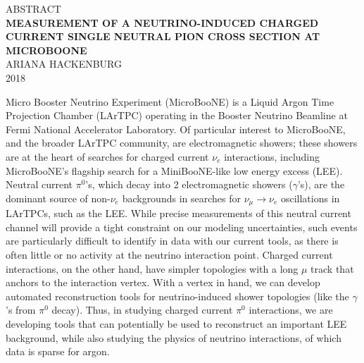 %

\thispagestyle{empty}
\begin{center}
{\footnotesize ABSTRACT}\\
\vspace{4 mm}
{\large \textbf{MEASUREMENT OF A NEUTRINO-INDUCED CHARGED CURRENT SINGLE NEUTRAL PION CROSS SECTION AT MICROBOONE}}\\
\vspace{6 mm}
{\footnotesize ARIANA HACKENBURG\\
2018\\}
\end{center}

\par
Micro Booster Neutrino Experiment (MicroBooNE) is a Liquid Argon Time Projection Chamber (LArTPC) operating in the Booster Neutrino Beamline at Fermi National Accelerator Laboratory.  Of particular interest to MicroBooNE, and the broader LArTPC community, are electromagnetic showers; these showers are at the heart of searches for charged current $\nu_e$ interactions, including MicroBooNE's flagship search for a MiniBooNE-like low energy excess (LEE).  Neutral current $\pi^0$'s, which decay into 2 electromagnetic showers ($\gamma$'s), are the dominant source of non-$\nu_e$ backgrounds in searches for $\nu_{\mu}\rightarrow\nu_e$ oscillations in LArTPCs, such as the LEE. While precise measurements of this neutral current channel will provide a tight constraint on our modeling uncertainties, such events are particularly difficult to identify in data with our current tools, as there is often little or no activity at the neutrino interaction point. Charged current interactions, on the other hand, have simpler topologies with a long $\mu$ track that anchors to the interaction vertex.  With a vertex in hand, we can develop automated reconstruction tools for neutrino-induced shower topologies (like the $\gamma$'s from $\pi^0$ decay). Thus, in studying charged current $\pi^0$ interactions, we are developing tools that can potentially be used to reconstruct an important LEE background, while also studying the physics of neutrino interactions, of which data is sparse for argon.


